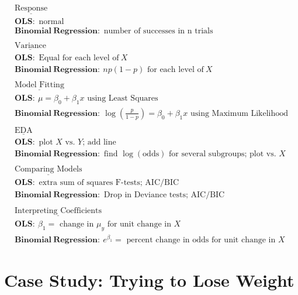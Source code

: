 \documentclass[
]{krantz}
\begin{document}
\begin{gather*}
\underline{\textrm{Response}} \\
\mathbf{OLS:}\textrm{ normal} \\
\mathbf{Binomial\ Regression:}\textrm{ number of successes in n trials} \\
\textrm{ } \\
\underline{\textrm{Variance}} \\
\mathbf{OLS:}\textrm{ Equal for each level of}\ X \\
\mathbf{Binomial\ Regression:}\ np(1-p)\textrm{ for each level of}\ X \\
\textrm{ } \\
\underline{\textrm{Model Fitting}} \\
\mathbf{OLS:}\ \mu=\beta_0+\beta_1x \textrm{ using Least Squares}\\
\mathbf{Binomial\ Regression:}\ \log\left(\frac{p}{1-p}\right)=\beta_0+\beta_1x \textrm{ using Maximum Likelihood}\\
\textrm{ } \\
\underline{\textrm{EDA}} \\
\mathbf{OLS:}\textrm{ plot $X$ vs. $Y$; add line} \\
\mathbf{Binomial\ Regression:}\textrm{ find $\log(\textrm{odds})$ for several subgroups; plot vs. $X$} \\
\textrm{ } \\
\underline{\textrm{Comparing Models}} \\
\mathbf{OLS:}\textrm{ extra sum of squares F-tests; AIC/BIC} \\
\mathbf{Binomial\ Regression:}\textrm{ Drop in Deviance tests; AIC/BIC} \\
\textrm{ } \\
\underline{\textrm{Interpreting Coefficients}} \\
\mathbf{OLS:}\ \beta_1=\textrm{ change in }\mu_y\textrm{ for unit change in $X$} \\
\mathbf{Binomial\ Regression:}\ e^{\beta_1}=\textrm{ percent change in odds for unit change in $X$} 
\end{gather*}

\hypertarget{case-study-trying-to-lose-weight}{%
\section{Case Study: Trying to Lose Weight}\label{case-study-trying-to-lose-weight}}
\end{document}
